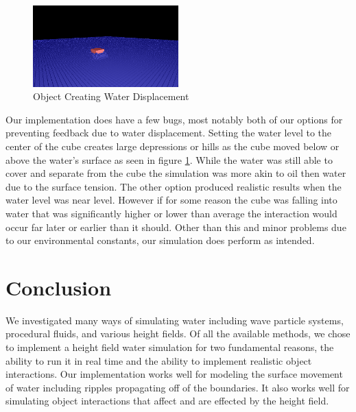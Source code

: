 \documentclass[12pt,notitlepage]{article}
\begin{document}
\begin{figure}[H]
    \caption{Object Creating Water Displacement}
    \label{fig:displacement}
    \centering
    \includegraphics[width=0.5\textwidth]{../www/images/objectWaterDisplacement}
\end{figure}

Our implementation does have a few bugs, most notably both of our options for 
preventing feedback due to water displacement.  Setting the water level to the 
center of the cube creates large depressions or hills as the cube moved below 
or above the water’s surface as seen in figure \ref{fig:displacement}.  While 
the water was still able to cover and separate from the cube the simulation was 
more akin to oil then water due to the surface tension.  The other option 
produced realistic results when the water level was near level.  However if for 
some reason the cube was falling into water that was significantly higher or 
lower than average the interaction would occur far later or earlier than it 
should.  Other than this and minor problems due to our environmental constants, 
our simulation does perform as intended.

\section{Conclusion}

We investigated many ways of simulating water including wave particle systems, 
procedural fluids, and various height fields. Of all the available methods, we 
chose to implement a height field water simulation for two fundamental reasons, 
the ability to run it in real time and the ability to implement realistic 
object interactions. Our implementation works well for modeling the surface 
movement of water including ripples propagating off of the boundaries. It also 
works well for simulating object interactions that affect and are effected by 
the height field.
\end{document}
